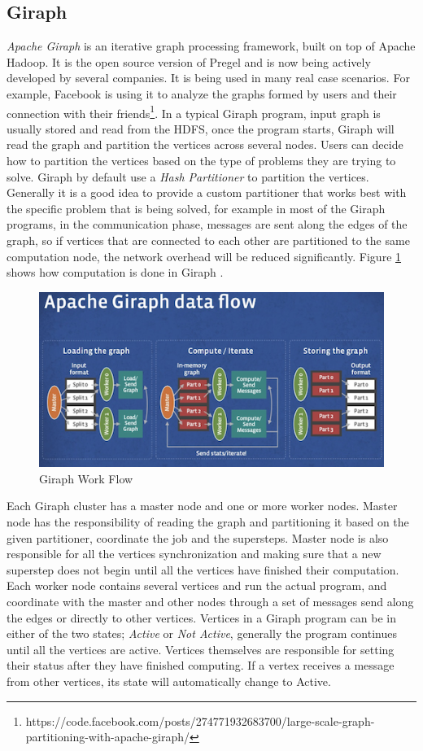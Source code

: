 \documentclass[english]{tktltiki}
\begin{document}
\subsection{Giraph}
\textit{Apache Giraph} is an iterative graph processing framework, built on top of Apache Hadoop. It is the open source version of Pregel and is now being actively developed by several companies. It is being used in many real case scenarios. For example, Facebook is using it to analyze the graphs formed by users and their connection with their friends\footnote{https://code.facebook.com/posts/274771932683700/large-scale-graph-partitioning-with-apache-giraph/}. 
In a typical Giraph program, input graph is usually stored and read from the HDFS, once the program starts, Giraph will read the graph and partition the vertices across several nodes. Users can decide how to partition the vertices based on the type of problems they are trying to solve. Giraph by default use a \textit{Hash Partitioner} to partition the vertices. Generally it is a good idea to provide a custom partitioner that works best with the specific problem that is being solved, for example in most of the Giraph programs, in the communication phase, messages are sent along the edges of the graph, so if vertices that are connected to each other are partitioned to the same computation node, the network overhead will be reduced significantly.    
Figure \ref{fig:giraph} shows how computation is done in Giraph .
\begin{figure}[ht!]
\centering
\includegraphics[width=130mm]{figures/giraphdataflow.png}
\caption{Giraph Work Flow \protect \footnotemark}
\label{fig:giraph}
\end{figure}
Each Giraph cluster has a master node and one or more worker nodes. Master node has the responsibility of reading the graph and partitioning it based on the given partitioner, coordinate the job and the supersteps. Master node is also responsible for  all the vertices synchronization and making sure that a new superstep does not begin until all the vertices have finished their computation. Each worker node contains several vertices and run the actual program, and coordinate with the master and other nodes through a set of messages send along the edges or directly to other vertices. Vertices in a Giraph program can be in either of the two states; \textit{Active} or \textit{Not Active}, generally the program continues until all the vertices are active. Vertices themselves are responsible for setting their status after they have finished computing. If a vertex receives a message from other vertices, its state will automatically change to Active.
\end{document}

